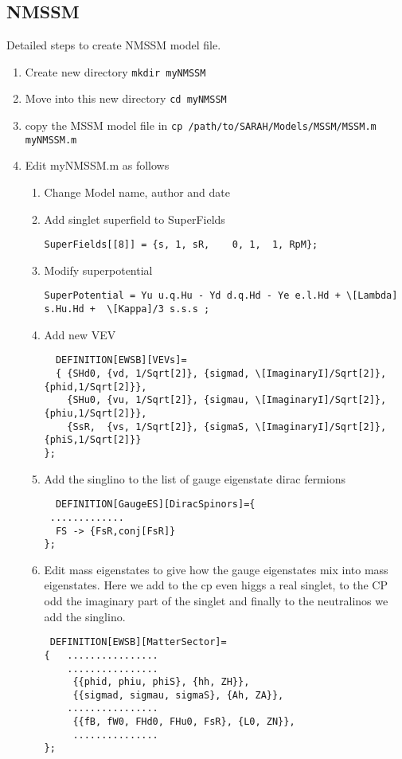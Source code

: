 \documentclass[final,3p,11pt,pdflatex]{elsarticle}
\newcommand{\code}[1]{\lstinline|#1|}  %
\begin{document}
\subsection{NMSSM}
Detailed steps to create NMSSM model file.
\begin{enumerate}
\item Create new directory \code{mkdir myNMSSM}
\item Move into this new directory \code{cd myNMSSM}
\item copy the MSSM model file in \code{cp /path/to/SARAH/Models/MSSM/MSSM.m  myNMSSM.m}
\item Edit myNMSSM.m as follows
\begin{enumerate}
\item  Change Model name, author and date
\item Add singlet superfield to SuperFields
\begin{lstlisting}
SuperFields[[8]] = {s, 1, sR,    0, 1,  1, RpM};
\end{lstlisting}
\item Modify superpotential
\begin{lstlisting}
SuperPotential = Yu u.q.Hu - Yd d.q.Hd - Ye e.l.Hd + \[Lambda] s.Hu.Hd +  \[Kappa]/3 s.s.s ;
\end{lstlisting}
\item Add new VEV
\begin{lstlisting} 
  DEFINITION[EWSB][VEVs]= 
  { {SHd0, {vd, 1/Sqrt[2]}, {sigmad, \[ImaginaryI]/Sqrt[2]},{phid,1/Sqrt[2]}},
    {SHu0, {vu, 1/Sqrt[2]}, {sigmau, \[ImaginaryI]/Sqrt[2]},{phiu,1/Sqrt[2]}},
    {SsR,  {vs, 1/Sqrt[2]}, {sigmaS, \[ImaginaryI]/Sqrt[2]},{phiS,1/Sqrt[2]}}
};
\end{lstlisting}
\item  Add the singlino to the list of gauge eigenstate dirac fermions
\begin{lstlisting}
  DEFINITION[GaugeES][DiracSpinors]={
 .............
  FS -> {FsR,conj[FsR]}   
};
\end{lstlisting}
\item Edit mass eigenstates to give how the gauge eigenstates mix into mass eigenstates.  Here we add to the cp even higgs a real singlet, to the CP odd the imaginary part of the singlet and finally to the neutralinos we add the singlino.

\begin{lstlisting}
 DEFINITION[EWSB][MatterSector]= 
{   ................
    ................
     {{phid, phiu, phiS}, {hh, ZH}},      
     {{sigmad, sigmau, sigmaS}, {Ah, ZA}},
    ................
     {{fB, fW0, FHd0, FHu0, FsR}, {L0, ZN}},
     ...............
}; 


\end{lstlisting}
\end{enumerate}
\end{enumerate}
\end{document}
